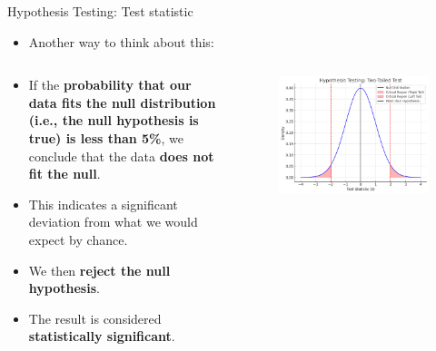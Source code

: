 \documentclass[
  ignorenonframetext,
]{beamer}
\providecommand{\tightlist}{%
  \setlength{\itemsep}{0pt}\setlength{\parskip}{0pt}}
\begin{document}
\begin{frame}{Hypothesis Testing: Test statistic}
\label{hypothesis-testing-test-statistic-3}
\begin{itemize}
\tightlist
\item
  Another way to think about this:
\end{itemize}

\begin{columns}[T]
\begin{column}{0.48\textwidth}
\small

\begin{itemize}
\tightlist
\item
  If the \textbf{probability that our data fits the null distribution
  (i.e., the null hypothesis is true) is less than 5\%}, we conclude
  that the data \textbf{does not fit the null}.
\item
  This indicates a significant deviation from what we would expect by
  chance.
\item
  We then \textbf{reject the null hypothesis}.
\item
  The result is considered \textbf{statistically significant}.\\
\end{itemize}
\end{column}

\begin{column}{0.48\textwidth}
\begin{figure}

{\centering \includegraphics[width=0.8\linewidth]{figs/plot1} 

}

\end{figure}
\end{column}
\end{columns}
\end{frame}
\end{document}
